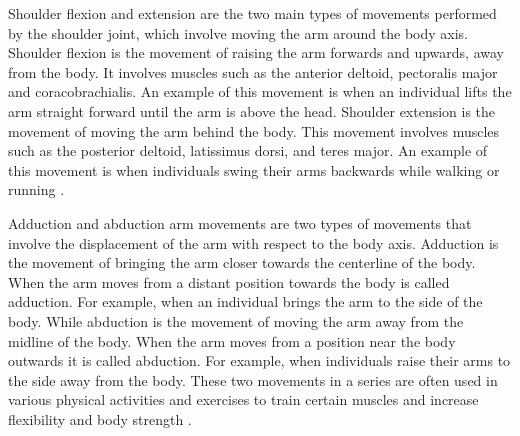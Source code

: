 Shoulder flexion and extension are the two main types of movements performed by the shoulder joint, which involve moving the arm around the body axis. Shoulder flexion is the movement of raising the arm forwards and upwards, away from the body. It involves muscles such as the anterior deltoid, pectoralis major and coracobrachialis. An example of this movement is when an individual lifts the arm straight forward until the arm is above the head. Shoulder extension is the movement of moving the arm behind the body. This movement involves muscles such as the posterior deltoid, latissimus dorsi, and teres major. An example of this movement is when individuals swing their arms backwards while walking or running \cite{ShoulderFlexionExtension1}.

Adduction and abduction arm movements are two types of movements that involve the displacement of the arm with respect to the body axis. Adduction is the movement of bringing the arm closer towards the centerline of the body. When the arm moves from a distant position towards the body is called adduction. For example, when an individual brings the arm to the side of the body. While abduction is the movement of moving the arm away from the midline of the body. When the arm moves from a position near the body outwards it is called abduction. For example, when individuals raise their arms to the side away from the body. These two movements in a series are often used in various physical activities and exercises to train certain muscles and increase flexibility and body strength \cite{AdductionAbduction1}.

